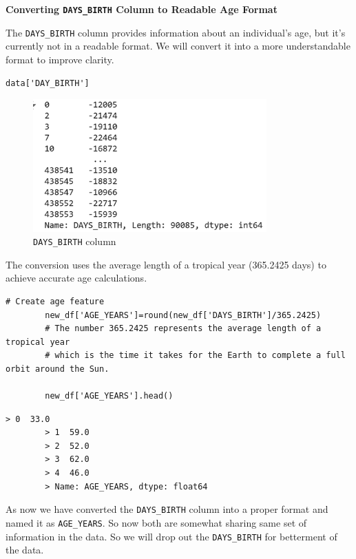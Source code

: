 \documentclass[12pt]{report}
\begin{document}
    {\bfseries Converting \texttt{DAYS\_BIRTH} Column to Readable Age Format}

    The \texttt{DAYS\_BIRTH} column provides information about an individual's age, but it's currently not in a readable format. We will convert it into a more understandable format to improve clarity.

    \begin{lstlisting}[style=default, language=python*, gobble=3]
        data['DAY_BIRTH']
    \end{lstlisting}

    \begin{figure}[h!]
        \centering
        \includegraphics[width=0.8\textwidth]{resources/pic/‘DAYS BIRTH’ column.png}
        \caption{\texttt{DAYS\_BIRTH} column}
        \label{DAYS BIRTH column}
    \end{figure}

    The conversion uses the average length of a tropical year (365.2425 days) to achieve accurate age calculations.

    \begin{lstlisting}[style=numbered, language=python*, gobble=3]
        # Create age feature
        new_df['AGE_YEARS']=round(new_df['DAYS_BIRTH']/365.2425)
        # The number 365.2425 represents the average length of a tropical year
        # which is the time it takes for the Earth to complete a full orbit around the Sun.
        
        new_df['AGE_YEARS'].head()
    \end{lstlisting}

    \begin{lstlisting}[style=default, language=python*, gobble=3]
        > 0  33.0
        > 1  59.0
        > 2  52.0
        > 3  62.0
        > 4  46.0
        > Name: AGE_YEARS, dtype: float64
    \end{lstlisting}

    As now we have converted the \texttt{DAYS\_BIRTH} column into a proper format and named it as \texttt{AGE\_YEARS}. So now both are somewhat sharing same set of information in the data. So we will drop out the \texttt{DAYS\_BIRTH} for betterment of the data.
\end{document}
